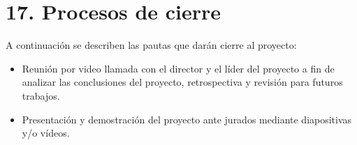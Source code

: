 \documentclass[11pt]{charter}
\begin{document}
\section{17. Procesos de cierre}    
\label{sec:cierre}

A continuación se describen las pautas que darán cierre al proyecto:

\begin{itemize}
\item Reunión por video llamada con el director y el líder del proyecto a fin de analizar las conclusiones del proyecto, retrospectiva y revisión para futuros trabajos.
\item Presentación y demostración del proyecto ante jurados mediante diapositivas y/o vídeos.
\end{itemize}
\end{document}
